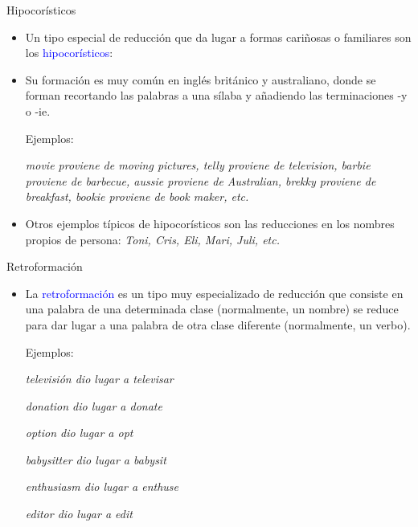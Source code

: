 \documentclass{beamer}
\begin{document}
\begin{frame}{Hipocorísticos}
	
\begin{itemize}
	\item Un tipo especial de reducción que da lugar a formas cariñosas o familiares son los \textcolor{blue}{hipocorísticos}: 
	
	\item Su formación es muy común en inglés británico y australiano, donde se forman recortando las palabras a una sílaba y añadiendo las terminaciones -y o -ie.

	Ejemplos: 
	
	\it{movie} proviene de \it{moving pictures}, \it{telly} proviene de \it{television}, \it{barbie} proviene de \it{barbecue}, \it{aussie} proviene de \it{Australian}, \it{brekky} proviene de \it{breakfast}, \it{bookie} proviene de \it{book maker}, etc.
	
	\item Otros ejemplos típicos de hipocorísticos son las reducciones en los nombres propios de persona: \it{Toni, Cris, Eli, Mari, Juli}, etc.
\end{itemize}

\end{frame}

\begin{frame}{Retroformación}

\begin{itemize}
	\item La \textcolor{blue}{retroformación} es un tipo muy especializado de reducción que consiste en una palabra de una determinada clase (normalmente, un nombre) se reduce para dar lugar a una palabra de otra clase diferente (normalmente, un verbo).
	
	Ejemplos:
	
	\it{televisión} dio lugar a \it{televisar}
	
	\it{donation} dio lugar a \it{donate}

	\it{option} dio lugar a \it{opt}

	\it{babysitter} dio lugar a \it{babysit}

	\it{enthusiasm} dio lugar a \it{enthuse}

	\it{editor} dio lugar a \it{edit}
\end{itemize}

\end{frame}
\end{document}
